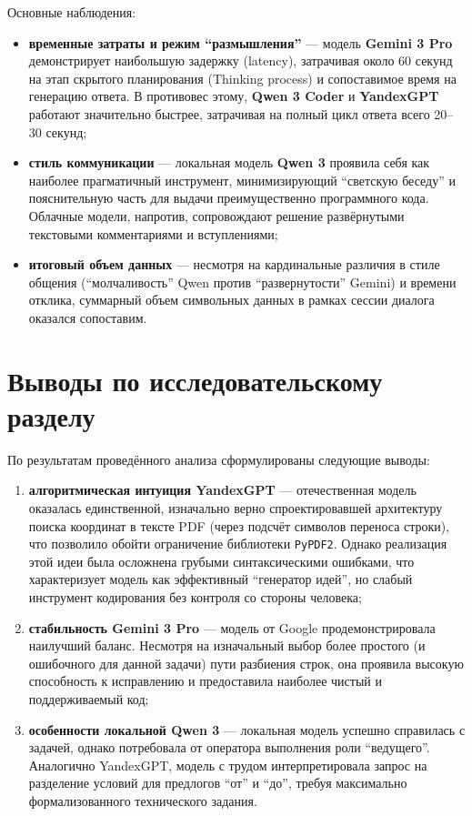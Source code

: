 Основные наблюдения:
\begin{itemize}
    \item \textbf{временные затраты и режим ``размышления''} --- модель \textbf{Gemini 3 Pro} демонстрирует наибольшую задержку (latency), затрачивая около 60 секунд на этап скрытого планирования (Thinking process) и сопоставимое время на генерацию ответа. В противовес этому, \textbf{Qwen 3 Coder} и \textbf{YandexGPT} работают значительно быстрее, затрачивая на полный цикл ответа всего 20--30 секунд;
    \item \textbf{стиль коммуникации} --- локальная модель \textbf{Qwen 3} проявила себя как наиболее прагматичный инструмент, минимизирующий ``светскую беседу'' и пояснительную часть для выдачи преимущественно программного кода. Облачные модели, напротив, сопровождают решение развёрнутыми текстовыми комментариями и вступлениями;
    \item \textbf{итоговый объем данных} --- несмотря на кардинальные различия в стиле общения (``молчаливость'' Qwen против ``развернутости'' Gemini) и времени отклика, суммарный объем символьных данных в рамках сессии диалога оказался сопоставим.
\end{itemize}

\section{Выводы по исследовательскому разделу}

По результатам проведённого анализа сформулированы следующие выводы:
\begin{enumerate}
    \item \textbf{алгоритмическая интуиция YandexGPT} --- отечественная модель оказалась единственной, изначально верно спроектировавшей архитектуру поиска координат в тексте PDF (через подсчёт символов переноса строки), что позволило обойти ограничение библиотеки \texttt{PyPDF2}. Однако реализация этой идеи была осложнена грубыми синтаксическими ошибками, что характеризует модель как эффективный ``генератор идей'', но слабый инструмент кодирования без контроля со стороны человека;
    \item \textbf{стабильность Gemini 3 Pro} --- модель от Google продемонстрировала наилучший баланс. Несмотря на изначальный выбор более простого (и ошибочного для данной задачи) пути разбиения строк, она проявила высокую способность к исправлению и предоставила наиболее чистый и поддерживаемый код;
    \item \textbf{особенности локальной Qwen 3} --- локальная модель успешно справилась с задачей, однако потребовала от оператора выполнения роли ``ведущего''. Аналогично YandexGPT, модель с трудом интерпретировала запрос на разделение условий для предлогов ``от'' и ``до'', требуя максимально формализованного технического задания.
\end{enumerate}

